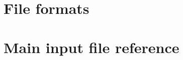 \documentclass[12pt,a4paper]{report}
\begin{document}






%



% 



%


\chapter{File formats}
\label{chapter:file-formats}





% 
%   

%  
% 
%  

\chapter{Main input file reference}
\label{chapter:input-tree-reference}






\end{document}
